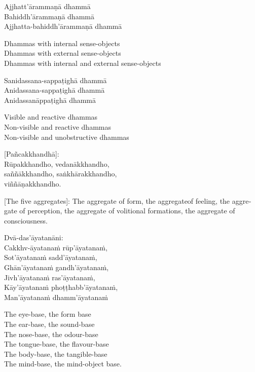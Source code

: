 Ajjhatt’ārammaṇā dhammā\\
Bahiddh’ārammaṇā dhammā\\
Ajjhatta-bahiddh’ārammaṇā dhammā

\begin{english}
  Dhammas with internal sense-objects\\
  Dhammas with external sense-objects\\
  Dhammas with internal and external sense-objects
\end{english}

Sanidassana-sappaṭighā dhammā\\
Anidassana-sappaṭighā dhammā\\
Anidassanāppaṭighā dhammā

\begin{english}
  Visible and reactive dhammas\\
  Non-visible and reactive dhammas\\
  Non-visible and unobstructive dhammas
\end{english}

\suttaRef{[Dhs 1]}

[Pañcakkhandhā]:\\
Rūpakkhandho, vedanākkhandho,\\
saññākkhandho, saṅkhārakkhandho,\\
viññāṇakkhandho.

\begin{english}
  [The five aggregates]: The aggregate of form, the aggregateof feeling, the aggregate of perception, the aggregate of volitional formations, the aggregate of consciousness.
\end{english}

\suttaRef{[MN 109]}

Dvā-das’āyatanāni:\\
Cakkhv-āyatanaṁ rūp’āyatanaṁ,\\
Sot’āyatanaṁ sadd’āyatanaṁ,\\
Ghān’āyatanaṁ gandh’āyatanaṁ,\\
Jivh’āyatanaṁ ras’āyatanaṁ,\\
Kāy’āyatanaṁ phoṭṭhabb’āyatanaṁ,\\
Man’āyatanaṁ dhamm’āyatanaṁ

\begin{english}
  The eye-base, the form base\\
  The ear-base, the sound-base\\
  The nose-base, the odour-base\\
  The tongue-base, the flavour-base\\
  The body-base, the tangible-base\\
  The mind-base, the mind-object base.
\end{english}

